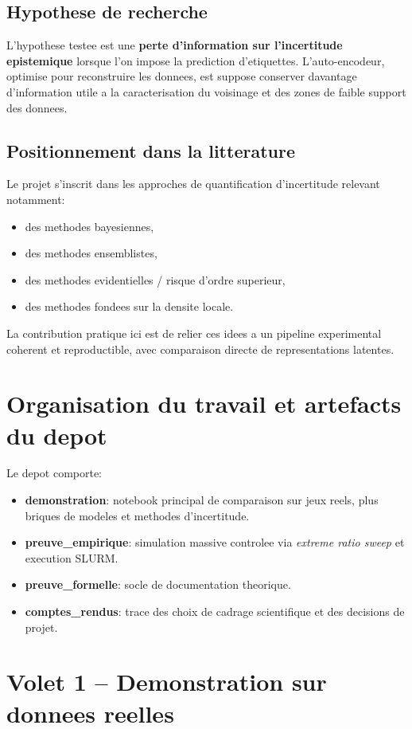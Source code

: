 \documentclass[11pt,a4paper]{article}
\begin{document}
\subsection{Hypothese de recherche}
L'hypothese testee est une \textbf{perte d'information sur l'incertitude epistemique} lorsque l'on impose la prediction d'etiquettes. L'auto-encodeur, optimise pour reconstruire les donnees, est suppose conserver davantage d'information utile a la caracterisation du voisinage et des zones de faible support des donnees.

\subsection{Positionnement dans la litterature}
Le projet s'inscrit dans les approches de quantification d'incertitude relevant notamment:
\begin{itemize}[leftmargin=1.2cm]
    \item des methodes bayesiennes,
    \item des methodes ensemblistes,
    \item des methodes evidentielles / risque d'ordre superieur,
    \item des methodes fondees sur la densite locale.
\end{itemize}
La contribution pratique ici est de relier ces idees a un pipeline experimental coherent et reproductible, avec comparaison directe de representations latentes.

\section{Organisation du travail et artefacts du depot}
Le depot comporte:
\begin{itemize}[leftmargin=1.2cm]
    \item \textbf{demonstration}: notebook principal de comparaison sur jeux reels, plus briques de modeles et methodes d'incertitude.
    \item \textbf{preuve\_empirique}: simulation massive controlee via \textit{extreme ratio sweep} et execution SLURM.
    \item \textbf{preuve\_formelle}: socle de documentation theorique.
    \item \textbf{comptes\_rendus}: trace des choix de cadrage scientifique et des decisions de projet.
\end{itemize}

\section{Volet 1 -- Demonstration sur donnees reelles}
\end{document}
